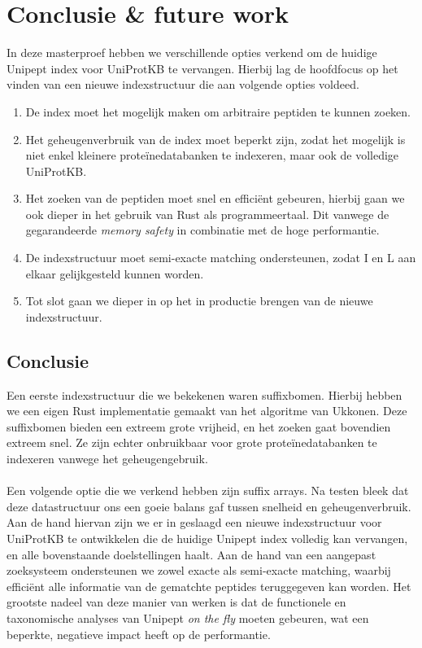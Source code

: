 \chapter{Conclusie \& future work}\label{ch:conclusie}
In deze masterproef hebben we verschillende opties verkend om de huidige Unipept index voor UniProtKB te vervangen.
Hierbij lag de hoofdfocus op het vinden van een nieuwe indexstructuur die aan volgende opties voldeed.
\begin{enumerate}
    \item De index moet het mogelijk maken om arbitraire peptiden te kunnen zoeken.
    \item Het geheugenverbruik van de index moet beperkt zijn, zodat het mogelijk is niet enkel kleinere proteïnedatabanken te indexeren, maar ook de volledige UniProtKB.
    \item Het zoeken van de peptiden moet snel en efficiënt gebeuren, hierbij gaan we ook dieper in het gebruik van Rust als programmeertaal.
    Dit vanwege de gegarandeerde \textit{memory safety} in combinatie met de hoge performantie.
    \item De indexstructuur moet semi-exacte matching ondersteunen, zodat I en L aan elkaar gelijkgesteld kunnen worden.
    \item Tot slot gaan we dieper in op het in productie brengen van de nieuwe indexstructuur.
\end{enumerate}

\section{Conclusie}
Een eerste indexstructuur die we bekekenen waren suffixbomen.
Hierbij hebben we een eigen Rust implementatie gemaakt van het algoritme van Ukkonen.
Deze suffixbomen bieden een extreem grote vrijheid, en het zoeken gaat bovendien extreem snel.
Ze zijn echter onbruikbaar voor grote proteïnedatabanken te indexeren vanwege het geheugengebruik.
\\ \\
Een volgende optie die we verkend hebben zijn suffix arrays.
Na testen bleek dat deze datastructuur ons een goeie balans gaf tussen snelheid en geheugenverbruik.
Aan de hand hiervan zijn we er in geslaagd een nieuwe indexstructuur voor UniProtKB te ontwikkelen die de huidige Unipept index volledig kan vervangen, en alle bovenstaande doelstellingen haalt.
Aan de hand van een aangepast zoeksysteem ondersteunen we zowel exacte als semi-exacte matching, waarbij efficiënt alle informatie van de gematchte peptides teruggegeven kan worden.
Het grootste nadeel van deze manier van werken is dat de functionele en taxonomische analyses van Unipept \textit{on the fly} moeten gebeuren, wat een beperkte, negatieve impact heeft op de performantie.

